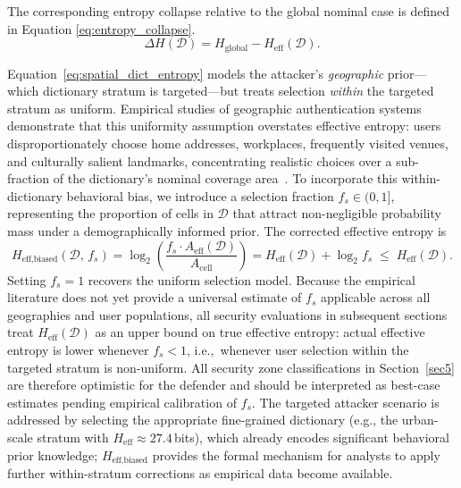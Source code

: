 \documentclass[mathematics,article,accept,pdftex,moreauthors]{Definitions/mdpi}
\begin{document}
The corresponding entropy collapse relative to the global nominal case is defined in Equation \eqref{eq:entropy_collapse}.
\begin{equation}
\Delta H(\mathcal{D}) = H_{\text{global}} - H_{\text{eff}}(\mathcal{D}).
\label{eq:entropy_collapse}
\end{equation}

{Equation~\eqref{eq:spatial_dict_entropy} models the attacker's \emph{geographic} prior---which dictionary stratum is targeted---but treats selection \emph{within} the targeted stratum as uniform. Empirical studies of geographic authentication systems demonstrate that this uniformity assumption overstates effective entropy: users disproportionately choose home addresses, workplaces, frequently visited venues, and culturally salient landmarks, concentrating realistic choices over a sub-fraction of the dictionary's nominal coverage area~\cite{Sun2012,Thorpe2013,AlAmeen2014}. To incorporate this within-dictionary behavioral bias, we introduce a selection fraction $f_s \in (0,1]$, representing the proportion of cells in $\mathcal{D}$ that attract non-negligible probability mass under a demographically informed prior. The corrected effective entropy is
\begin{equation}
H_{\text{eff,biased}}(\mathcal{D},\,f_s)
  = \log_2\!\left(\frac{f_s \cdot A_{\text{eff}}(\mathcal{D})}{A_{\text{cell}}}\right)
  = H_{\text{eff}}(\mathcal{D}) + \log_2 f_s \;\leq\; H_{\text{eff}}(\mathcal{D}).
\label{eq:biased_entropy}
\end{equation}
Setting $f_s = 1$ recovers the uniform selection model. Because the empirical literature does not yet provide a universal estimate of $f_s$ applicable across all geographies and user populations, all security evaluations in subsequent sections treat $H_{\text{eff}}(\mathcal{D})$ as an upper bound on true effective entropy: actual effective entropy is lower whenever $f_s < 1$, i.e.,\ whenever user selection within the targeted stratum is non-uniform. All security zone classifications in Section~\ref{sec5} are therefore optimistic for the defender and should be interpreted as best-case estimates pending empirical calibration of $f_s$. The targeted attacker scenario is addressed by selecting the appropriate fine-grained dictionary (e.g., the urban-scale stratum with $H_{\text{eff}} \approx 27.4$\,bits), which already encodes significant behavioral prior knowledge; $H_{\text{eff,biased}}$ provides the formal mechanism for analysts to apply further within-stratum corrections as empirical data become available.}
\end{document}
